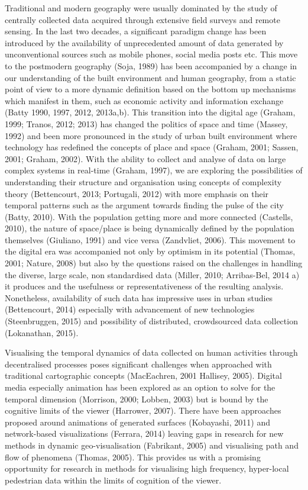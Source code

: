 Traditional and modern geography were usually dominated by the study of centrally collected data acquired through extensive field surveys and remote sensing. In the last two decades, a significant paradigm change has been introduced by the availability of unprecedented amount of data generated by unconventional sources such as mobile phones, social media posts etc. This move to the postmodern geography (Soja, 1989) has been accompanied by a change in our understanding of the built environment and human geography, from a static point of view to a more dynamic definition based on the bottom up mechanisms which manifest in them, such as economic activity and information exchange (Batty 1990, 1997, 2012, 2013a,b). This transition into the digital age (Graham, 1999; Tranos, 2012; 2013) has changed the politics of space and time (Massey, 1992) and been more pronounced in the study of urban built environment where technology has redefined the concepts of place and space (Graham, 2001; Sassen, 2001; Graham, 2002). With the ability to collect and analyse of data on large complex systems in real-time (Graham, 1997), we are exploring the possibilities of understanding their structure and organisation using concepts of complexity theory (Bettencourt, 2013; Portugali, 2012) with more emphasis on their temporal patterns such as the argument towards finding the pulse of the city (Batty, 2010). With the population getting more and more connected (Castells, 2010), the nature of space/place is being dynamically defined by the population themselves (Giuliano, 1991) and vice versa (Zandvliet, 2006). This movement to the digital era was accompanied not only by optimism in its potential (Thomas, 2001; Nature, 2008) but also by the questions raised on the challenges in handling the diverse, large scale, non standardised data (Miller, 2010; Arribas-Bel, 2014 a) it produces and the usefulness or representativeness of the resulting analysis. Nonetheless, availability of such data has impressive uses in urban studies (Bettencourt, 2014) especially with advancement of new technologies (Steenbruggen, 2015) and possibility of distributed, crowdsourced data collection (Lokanathan, 2015). 

Visualising the temporal dynamics of data collected on human activities through decentralised processes poses significant challenges when approached with traditional cartographic concepts (MacEachren, 2001 Hallisey, 2005). Digital media especially animation has been explored as an option to solve for the temporal dimension (Morrison, 2000; Lobben, 2003) but is bound by the cognitive limits of the viewer (Harrower, 2007). There have been approaches proposed around animations of generated surfaces (Kobayashi, 2011) and network-based visualizations (Ferrara, 2014) leaving gaps in research for new methods in dynamic geo-visualisation (Fabrikant, 2005) and visualising path and flow of phenomena (Thomas, 2005). This provides us with a promising opportunity for research in methods for visualising high frequency, hyper-local pedestrian data within the limits of cognition of the viewer.

